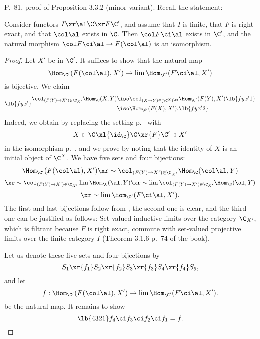 \documentclass[12pt]{article}
\theoremstyle{remark}
\theoremstyle{definition}
\begin{document}
\begin{s}%
P.~81, proof of Proposition 3.3.2 (minor variant). Recall the statement:

\begin{prop}[Proposition 3.3.2 p.~81] 
Consider functors $I\xr\al\C\xr F\C'$, and assume that $I$ is finite, that $F$ is right exact, and that $\col\al$ exists in $\C$. Then $\col F\ci\al$ exists in $\C'$, and the natural morphism $\col F\ci\al\to F(\col\al)$ is an isomorphism. 
\end{prop} 

\begin{proof}
Let $X'$ be in $\C'$. It suffices to show that the natural map 
$$
\Hom_{\C'}(F(\col\al),X')\to\lim\Hom_{\C'}(F\ci\al,X')
$$ 
is bijective. We claim 
\begin{subequations}\lb{fyx'}%
\begin{align}
\col_{(F(Y)\to X')\in\C_{X'}}\Hom_\C(X,Y)&\iso\col_{(X\to Y)\in(\C^X)^{\op}}\Hom_{\C'}(F(Y),X')\lb{fyx'1}\\
&\iso\Hom_{\C'}(F(X),X').\lb{fyx'2}
\end{align}
\end{subequations}
Indeed, we obtain  by replacing the setting  p.~ with 
$$
X\in\C\xl{\id_\C}\C\xr{F}\C'\ni X'
$$ 
in the isomorphism  p.~, and we prove  by noting that the identity of $X$ is an initial object of $\C^X$. We have five sets and four bijections: 
$$ 
\Hom_{\C'}(F(\col\al),X')\xr\sim\col_{(F(Y)\to X')\in\C_{X'}}\Hom_\C(\col\al,Y)
$$
$$
\xr\sim\col_{(F(Y)\to X')\in\C_{X'}}\lim\Hom_\C(\al,Y)\xr\sim\lim\col_{(F(Y)\to X')\in\C_{X'}}\Hom_\C(\al,Y)
$$
$$
\xr\sim\lim\Hom_{\C'}(F\ci\al,X'). 
$$ 
The first and last bijections follow from , the second one is clear, and the third one can be justified as follows: Set-valued inductive limits over the category $\C_{X'}$, which is filtrant because $F$ is right exact, commute with set-valued projective limits over the finite category $I$ (Theorem 3.1.6 p.~74 of the book). 

Let us denote these five sets and four bijections by 
$$
S_1\xr{f_1}S_2\xr{f_2}S_3\xr{f_3}S_4\xr{f_4}S_5,
$$ 
and let 
$$
f:\Hom_{\C'}(F(\col\al),X')\to\lim\Hom_{\C'}(F\ci\al,X').
$$ 
be the natural map. It remains to show 
\begin{equation}\lb{4321}
f_4\ci f_3\ci f_2\ci f_1=f.
\end{equation} 


\end{proof}
\end{s}
\end{document}

